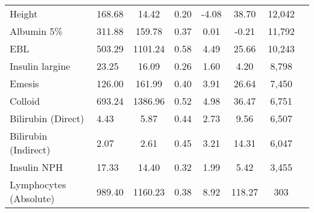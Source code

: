 \begin{longtable}{p{3.5cm}lcccccc}
Height & 168.68 & 14.42 & 0.20 & -4.08 & 38.70 & 12,042 \\
Albumin 5\% & 311.88 & 159.78 & 0.37 & 0.01 & -0.21 & 11,792 \\
EBL & 503.29 & 1101.24 & 0.58 & 4.49 & 25.66 & 10,243 \\
Insulin largine & 23.25 & 16.09 & 0.26 & 1.60 & 4.20 & 8,798 \\
Emesis & 126.00 & 161.99 & 0.40 & 3.91 & 26.64 & 7,450 \\
Colloid & 693.24 & 1386.96 & 0.52 & 4.98 & 36.47 & 6,751 \\
Bilirubin (Direct) & 4.43 & 5.87 & 0.44 & 2.73 & 9.56 & 6,507 \\
Bilirubin (Indirect) & 2.07 & 2.61 & 0.45 & 3.21 & 14.31 & 6,047 \\
Insulin NPH & 17.33 & 14.40 & 0.32 & 1.99 & 5.42 & 3,455 \\
Lymphocytes (Absolute) & 989.40 & 1160.23 & 0.38 & 8.92 & 118.27 & 303 \\
\end{longtable}

